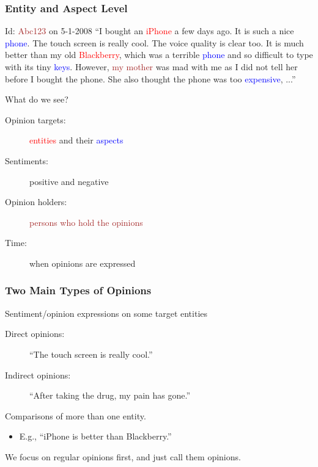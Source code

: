 \documentclass[t]{beamer}
\begin{document}
\begin{frame} \frametitle{Entity and Aspect Level}

\begin{block}{Id: \textcolor{brown}{Abc123} on 5-1-2008} 
  ``I bought an \textcolor{red}{iPhone} a few days ago. It is such a
  nice \textcolor{blue}{phone}. The touch screen is really cool. The
  voice quality is clear too. It is much better than my old
  \textcolor{red}{Blackberry}, which was a terrible
  \textcolor{blue}{phone} and so difficult to type with its tiny
  \textcolor{blue}{keys}. However, \textcolor{brown}{my mother} was
  mad with me as I did not tell her before I bought the phone. She
  also thought the phone was too \textcolor{blue}{expensive}, ...''
\end{block}

What do we see?
\begin{description}

\item [Opinion targets:] \textcolor{red}{entities} and their \textcolor{blue}{aspects} 
\item [Sentiments:] positive and negative 
\item [Opinion holders:] \textcolor{brown}{persons who hold the opinions}
\item [Time:] when opinions are expressed

\end{description}

\end{frame} 



\begin{frame} \frametitle{Two Main Types of Opinions} %


\begin{description}
\item [Regular opinions:] Sentiment/opinion expressions on some target entities

\begin{description}
\item [Direct opinions:] ``The touch screen is really cool.'' 
\item [Indirect opinions:] ``After taking the drug, my pain has gone.''
\end{description}

\item [Comparative opinions: ] Comparisons of more than one entity.
\begin{itemize}
\item E.g., ``iPhone is better than Blackberry.''
\end{itemize}

\item We focus on regular opinions first, and just call them opinions.

\end{description}

\end{frame} 
\end{document}
